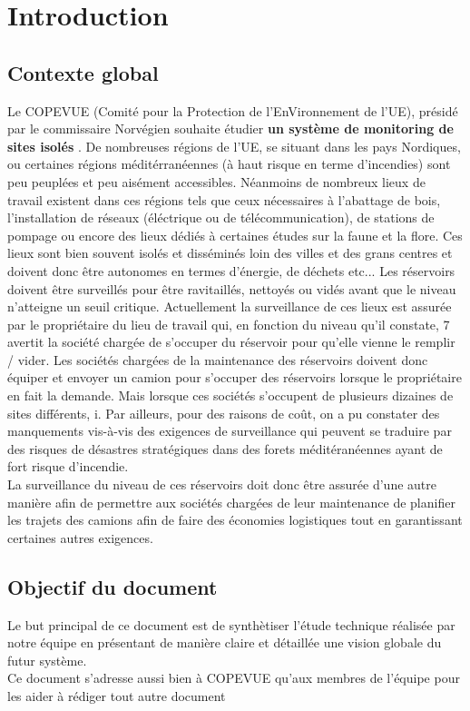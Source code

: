 \section{Introduction}
  \subsection{Contexte global}
    Le COPEVUE (Comité pour la Protection de l'EnVironnement de l'UE), présidé par le commissaire Norvégien souhaite étudier \textbf {un système
    de monitoring de sites isolés} .
    De nombreuses régions de l'UE, se situant dans les pays Nordiques, ou certaines régions méditérranéennes (à haut risque en terme d'incendies) sont peu peuplées et peu aisément accessibles. Néanmoins
    de nombreux lieux de travail existent dans ces régions tels que ceux nécessaires à l'abattage de bois, l'installation de réseaux (éléctrique ou de télécommunication),
    de stations de pompage ou encore des lieux dédiés à certaines études sur la faune et la flore. Ces lieux sont bien souvent isolés et disséminés loin des villes et des grans centres et doivent donc être autonomes en termes 
    d'énergie, de déchets etc...
    Les réservoirs doivent être surveillés pour être ravitaillés, nettoyés ou vidés avant que le niveau n'atteigne un seuil critique. 
    Actuellement la surveillance de ces lieux est assurée par le propriétaire du lieu de travail qui, en fonction du niveau qu'il constate, 7
    avertit la société chargée de s'occuper du réservoir pour qu'elle vienne le remplir / vider.
    Les sociétés chargées de la maintenance des réservoirs doivent donc équiper et envoyer un camion pour s'occuper des réservoirs lorsque 
    le propriétaire en fait la demande. Mais lorsque ces sociétés s'occupent de plusieurs dizaines de sites différents, i.
    Par ailleurs, pour des raisons de coût, on a pu constater des manquements vis-à-vis des exigences de surveillance qui peuvent se traduire par des risques 
    de désastres stratégiques dans des forets méditéranéennes ayant de fort risque d'incendie.\\
    La surveillance du niveau de ces réservoirs doit donc être assurée d'une autre manière afin de permettre aux sociétés chargées de leur maintenance de planifier les trajets des camions
    afin de faire des économies logistiques tout en garantissant certaines autres exigences.
  \subsection{Objectif du document}
    Le but principal de ce document est de synthètiser l'étude technique réalisée par notre équipe en présentant de manière claire et détaillée une vision globale du futur système.\\
    Ce document s'adresse aussi bien à COPEVUE qu'aux membres de l'équipe pour les aider à rédiger tout autre document
